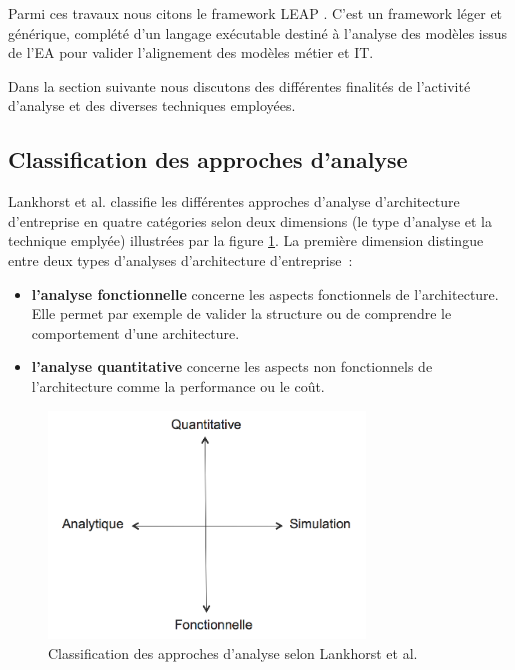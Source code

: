 Parmi ces travaux nous citons le framework LEAP \cite{clark2011leap}. C'est un framework léger et générique, complété d'un langage exécutable destiné à l'analyse des modèles issus de l'EA pour valider l'alignement des modèles métier et IT. 

Dans la section suivante nous discutons des différentes finalités de l'activité d'analyse et des diverses techniques employées.


	\subsection{Classification des approches d'analyse}
Lankhorst et al. \cite{lankhorst2009enterprise} classifie les différentes approches d'analyse d'architecture d'entreprise en quatre catégories selon deux dimensions (le type d'analyse et la technique emplyée) illustrées par la figure \ref{fig:classLankhorst}. La première dimension distingue entre deux types d'analyses d'architecture d'entreprise~:
	\begin{itemize}
		\item \textbf{l'analyse fonctionnelle} concerne les aspects fonctionnels de l'architecture. Elle permet par exemple de valider la structure ou de comprendre le comportement d'une architecture.
		\item \textbf{l'analyse quantitative} concerne les aspects non fonctionnels de l'architecture comme la performance ou le coût. 
\end{itemize}

\begin{figure}[!htbp]
 \begin{center}
  \includegraphics[width=0.75\textwidth]{images/Chapitre1/dimesionsLankhorts.png}
 \end{center}
 \caption{Classification des approches d'analyse selon Lankhorst et al. \protect\cite{lankhorst2009enterprise}}
 \label{fig:classLankhorst}
\end{figure}

